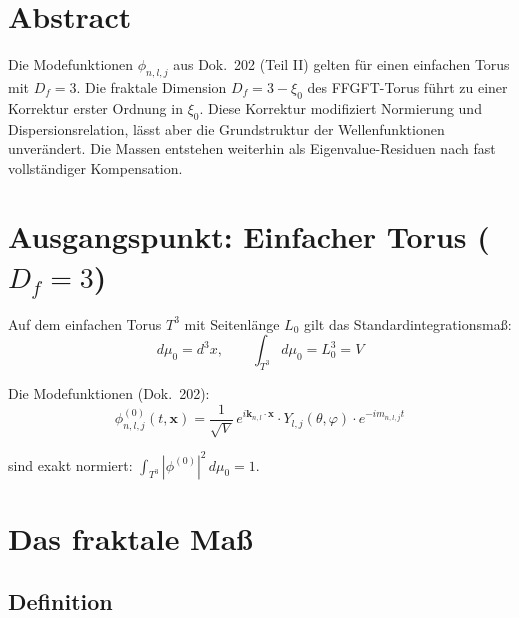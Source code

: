 
\section*{Abstract}

Die Modefunktionen $\phi_{n,l,j}$ aus Dok.~202 (Teil II) gelten
für einen einfachen Torus mit $D_f = 3$. Die fraktale Dimension
$D_f = 3-\xi_0$ des FFGFT-Torus führt zu einer Korrektur erster
Ordnung in $\xi_0$. Diese Korrektur modifiziert Normierung und
Dispersionsrelation, lässt aber die Grundstruktur der Wellenfunktionen
unverändert. Die Massen entstehen weiterhin als Eigenvalue-Residuen
nach fast vollständiger Kompensation.

\section{Ausgangspunkt: Einfacher Torus (\texorpdfstring{$D_f = 3$}{Df = 3})}

Auf dem einfachen Torus $T^3$ mit Seitenlänge $L_0$ gilt das
Standardintegrationsmaß:
\begin{equation}
  d\mu_0 = d^3x, \qquad
  \int_{T^3} d\mu_0 = L_0^3 = V
\end{equation}

Die Modefunktionen (Dok.~202):
\begin{equation}
  \phi_{n,l,j}^{(0)}(t,\mathbf{x})
  = \frac{1}{\sqrt{V}}\,
    e^{i\mathbf{k}_{n,l}\cdot\mathbf{x}} \cdot
    Y_{l,j}(\theta,\varphi) \cdot
    e^{-im_{n,l,j}t}
  \label{eq:phi0}
\end{equation}

sind exakt normiert: $\int_{T^3}|\phi^{(0)}|^2\,d\mu_0 = 1$.

\section{Das fraktale Maß}

\subsection{Definition}

